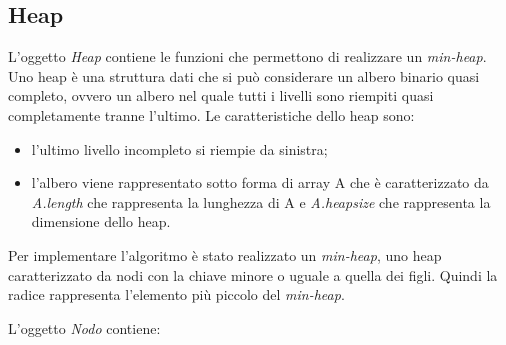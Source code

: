 \newpage


\subsection{Heap}
\label{Heap}

L'oggetto \textit{Heap} contiene le funzioni che permettono di realizzare un \textit{min-heap}. Uno heap è una struttura dati che si può considerare un albero binario quasi completo, ovvero un albero nel quale tutti i livelli sono riempiti quasi completamente tranne l'ultimo. Le caratteristiche dello heap sono:

\begin{itemize}
    \item l'ultimo livello incompleto si riempie da sinistra;
    \item l'albero viene rappresentato sotto forma di array A che è caratterizzato da \textit{A.length} che rappresenta la lunghezza di A e \textit{A.heapsize} che rappresenta la dimensione dello heap.
\end{itemize}

Per implementare l'algoritmo è stato realizzato un \textit{min-heap}, uno heap caratterizzato da nodi con la chiave minore o uguale a quella dei figli. Quindi la radice rappresenta l'elemento più piccolo del \textit{min-heap}.


L'oggetto \textit{Nodo} contiene:

